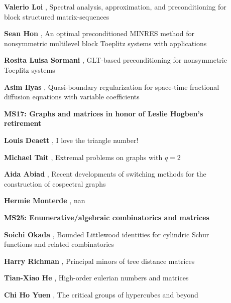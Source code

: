 \documentclass[ILAS2025-program.tex]{subfiles}
\begin{document}
\begin{description}
\begin{description}
    \item[] \textbf{Valerio Loi} , Spectral analysis, approximation, and preconditioning for block structured matrix-sequences
        \item[] \textbf{Sean Hon} , An optimal preconditioned MINRES method for nonsymmetric multilevel block Toeplitz systems with applications
        \item[] \textbf{Rosita Luisa Sormani} , GLT-based preconditioning for nonsymmetric Toeplitz systems
        \item[] \textbf{Asim Ilyas} , Quasi-boundary regularization for space-time fractional diffusion equations with variable coefficients
        \end{description}
    \begin{description}
    \item[] {\color{mstitle}\textbf{MS17: Graphs and matrices in honor of Leslie Hogben's retirement}} 
    \item[] \textbf{Louis Deaett} , I love the triangle number!
        \item[] \textbf{Michael Tait} , Extremal problems on graphs with $q=2$
        \item[] \textbf{Aida Abiad} , Recent developments of switching methods for the construction of cospectral graphs
        \item[] \textbf{Hermie Monterde} , nan
        \end{description}
    \begin{description}
    \item[] {\color{mstitle}\textbf{MS25: Enumerative/algebraic combinatorics and matrices}} 
    \item[] \textbf{Soichi Okada} , Bounded Littlewood identities for cylindric Schur functions and related combinatorics
        \item[] \textbf{Harry Richman} , Principal minors of tree distance matrices
        \item[] \textbf{Tian-Xiao He} , High-order eulerian numbers and matrices
        \item[] \textbf{Chi Ho Yuen} , The critical groups of hypercubes and beyond
        \end{description}

\end{description}
\end{document}
